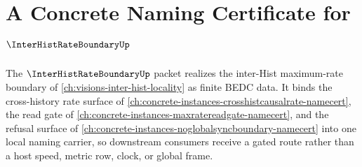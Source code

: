 \chapter{A Concrete Naming Certificate for $\InterHistRateBoundaryUp$}
\label{ch:concrete-instances-inter-hist-rate-boundary-namecert}

The $\InterHistRateBoundaryUp$ packet realizes the inter-Hist maximum-rate boundary of \autoref{ch:visions-inter-hist-locality} as finite BEDC data. It binds the cross-history rate surface of \autoref{ch:concrete-instances-crosshistcausalrate-namecert}, the read gate of \autoref{ch:concrete-instances-maxratereadgate-namecert}, and the refusal surface of \autoref{ch:concrete-instances-noglobalsyncboundary-namecert} into one local naming carrier, so downstream consumers receive a gated route rather than a host speed, metric row, clock, or global frame.




